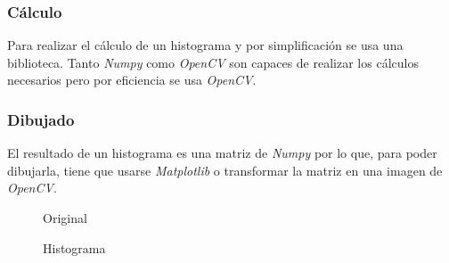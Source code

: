 \subsubsection{Cálculo}
Para realizar el cálculo de un histograma y por simplificación se usa
una biblioteca. Tanto \emph{Numpy} como \emph{OpenCV} son capaces de
realizar los cálculos necesarios pero por eficiencia se usa
\emph{OpenCV}.

\subsubsection{Dibujado}
El resultado de un histograma es una matriz de \emph{Numpy} por lo
que, para poder dibujarla, tiene que usarse \emph{Matplotlib} o
transformar la matriz en una imagen de \emph{OpenCV}.

\begin{figure}[H]
  \caption{Original}
  \centering \setlength\fboxsep{0pt} \setlength\fboxrule{0.5pt}
\end{figure}

\begin{figure}[H]
  \caption{Histograma}
  \centering \setlength\fboxsep{0pt} \setlength\fboxrule{0.5pt}
\end{figure}

